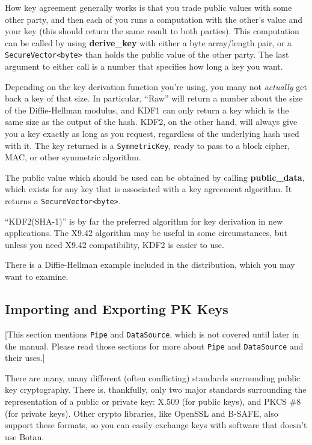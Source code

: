 \documentclass{article}
\newcommand{\function}[1]{\textbf{#1}}
\newcommand{\type}[1]{\texttt{#1}}
\begin{document}
How key agreement generally works is that you trade public values with some
other party, and then each of you runs a computation with the other's value and
your key (this should return the same result to both parties). This computation
can be called by using \function{derive\_key} with either a byte array/length
pair, or a \type{SecureVector<byte>} than holds the public value of the other
party. The last argument to either call is a number that specifies how long a
key you want.

Depending on the key derivation function you're using, you many not
\emph{actually} get back a key of that size. In particular, ``Raw'' will return
a number about the size of the Diffie-Hellman modulus, and KDF1 can only return
a key which is the same size as the output of the hash. KDF2, on the other
hand, will always give you a key exactly as long as you request, regardless of
the underlying hash used with it. The key returned is a \type{SymmetricKey},
ready to pass to a block cipher, MAC, or other symmetric algorithm.

The public value which should be used can be obtained by calling
\function{public\_data}, which exists for any key that is associated with a
key agreement algorithm. It returns a \type{SecureVector<byte>}.

``KDF2(SHA-1)'' is by far the preferred algorithm for key derivation in new
applications. The X9.42 algorithm may be useful in some circumstances, but
unless you need X9.42 compatibility, KDF2 is easier to use.

There is a Diffie-Hellman example included in the distribution, which you may
want to examine.

\subsection{Importing and Exporting PK Keys}

[This section mentions \type{Pipe} and \type{DataSource}, which is not covered
until later in the manual. Please read those sections for more about
\type{Pipe} and \type{DataSource} and their uses.]

There are many, many different (often conflicting) standards surrounding public
key cryptography. There is, thankfully, only two major standards surrounding
the representation of a public or private key: X.509 (for public keys), and
PKCS \#8 (for private keys). Other crypto libraries, like OpenSSL and B-SAFE,
also support these formats, so you can easily exchange keys with software that
doesn't use Botan.
\end{document}
